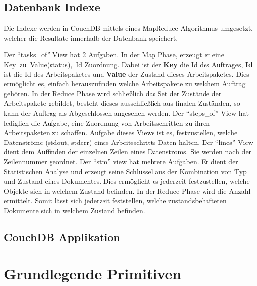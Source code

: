 \subsection{Datenbank Indexe}

Die Indexe werden in CouchDB mittels 
eines MapReduce \cite{couchdb:views} Algorithmus umgesetzt,
welcher die Resultate innerhalb der Datenbank speichert.

\begin{description}
    \dhitem[tasks\_of]
        Der ``tasks\_of'' View hat 2 Aufgaben.
        In der Map Phase, erzeugt er eine \hbox{Key zu Value(status), Id} Zuordnung.
        Dabei ist der \textbf{Key} die Id des Auftrages,
        \textbf{Id} ist die Id des Arbeitspaketes
        und \textbf{Value} der Zustand dieses Arbeitspaketes.
        Dies ermöglicht es, einfach herauszufinden
        welche Arbeitspakete zu welchem Auftrag gehören.
        In der Reduce Phase wird schließlich das Set
        der Zustände der Arbeitspakete gebildet,
        besteht dieses ausschließlich aus finalen Zuständen,
        so kann der Auftrag als Abgeschlossen angesehen werden.
    \dhitem[steps\_of]
        Der ``steps\_of'' View hat lediglich die Aufgabe,
        eine Zuordnung von Arbeitsschritten
        zu ihren Arbeitspaketen zu schaffen.
    \dhitem[streams]
        Aufgabe dieses Views ist es,
        festzustellen, welche Datenströme (stdout, stderr)
        eines Arbeitsschritts Daten halten.
    \dhitem[lines]
        Der ``lines'' View dient dem Auffinden der einzelnen Zeilen
        eines Datenstroms. Sie werden nach der Zeilennummer geordnet.
    \dhitem[stm]
        Der ``stm'' view hat mehrere Aufgaben.
        Er dient der Statistischen Analyse und
        erzeugt seine Schlüssel aus der Kombination
        von Typ und Zustand eines Dokumentes.
        Dies ermöglicht es jederzeit festzustellen,
        welche Objekte sich in welchem Zustand befinden.
        In der Reduce Phase wird die Anzahl ermittelt.
        Somit lässt sich jederzeit feststellen,
        welche zustandsbehafteten Dokumente
        sich in welchem Zustand befinden.
\end{description}

\subsection{CouchDB Applikation}

\section{Grundlegende Primitiven}

